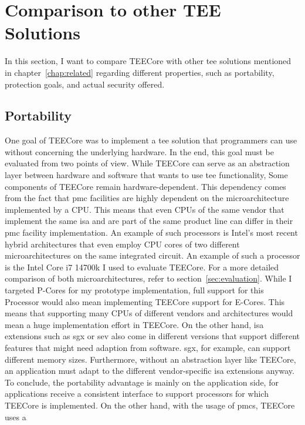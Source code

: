\section{Comparison to other TEE Solutions}
\label{eval:compare}
In this section, I want to compare TEECore with other \gls{tee} solutions
mentioned in chapter~\ref{chap:related} regarding different properties, such as
portability, protection goals, and actual security offered.

\subsection{Portability}
\label{eval:compare:portability}
One goal of TEECore was to implement a \gls{tee} solution that programmers can
use without concerning the underlying hardware. In the end, this goal must be
evaluated from two points of view. While TEECore can serve as an abstraction
layer between hardware and software that wants to use \gls{tee} functionality,
Some components of TEECore remain hardware-dependent. This dependency comes from
the fact that \gls{pmc} facilities are highly dependent on the microarchitecture
implemented by a CPU. This means that even CPUs of the same vendor that
implement the same \gls{isa} and are part of the same product line can differ in
their \gls{pmc} facility implementation. An example of such processors is
Intel's most recent hybrid architectures that even employ CPU cores of two
different microarchitectures on the same integrated circuit. An example of such
a processor is the Intel Core i7 14700k I used to evaluate TEECore. For a more
detailed comparison of both microarchitectures, refer to
section~\ref{sec:evaluation}. While I targeted P-Cores for my prototype
implementation, full support for this Processor would also mean implementing
TEECore support for E-Cores. This means that supporting many CPUs of different
vendors and architectures would mean a huge implementation effort in TEECore. On
the other hand, \gls{isa} extensions such as \gls{sgx} or \gls{sev} also come in
different versions that support different features that might need adaption from
software. \gls{sgx}, for example, can support different memory sizes.
Furthermore, without an abstraction layer like TEECore, an application must
adapt to the different vendor-specific \gls{isa} extensions anyway. To conclude,
the portability advantage is mainly on the application side, for applications
receive a consistent interface to support processors for which TEECore is
implemented. On the other hand, with the usage of \glspl{pmc}, TEECore uses a
